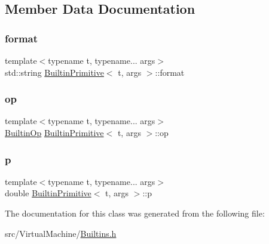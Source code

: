 \subsection{Member Data Documentation}
\mbox{\label{struct_builtin_primitive_aabf1561380f8c387cf3bf768f97bd4bd}} 
\subsubsection{\texorpdfstring{format}{format}}
{\footnotesize\ttfamily template$<$typename t, typename... args$>$ \\
std\+::string \hyperlink{struct_builtin_primitive}{Builtin\+Primitive}$<$ t, args $>$\+::format}

\mbox{\label{struct_builtin_primitive_a996bd520f47a299728229774117d6188}} 
\subsubsection{\texorpdfstring{op}{op}}
{\footnotesize\ttfamily template$<$typename t, typename... args$>$ \\
\hyperlink{_instruction_8h_af2fb7c87c5854c5733d7bb0506b06de7}{Builtin\+Op} \hyperlink{struct_builtin_primitive}{Builtin\+Primitive}$<$ t, args $>$\+::op}

\mbox{\label{struct_builtin_primitive_a1a8d8e62426c9454355412b80faf684c}} 
\subsubsection{\texorpdfstring{p}{p}}
{\footnotesize\ttfamily template$<$typename t, typename... args$>$ \\
double \hyperlink{struct_builtin_primitive}{Builtin\+Primitive}$<$ t, args $>$\+::p}



The documentation for this class was generated from the following file\+:\begin{DoxyCompactItemize}
\item 
src/\+Virtual\+Machine/\hyperlink{_builtins_8h}{Builtins.\+h}\end{DoxyCompactItemize}
